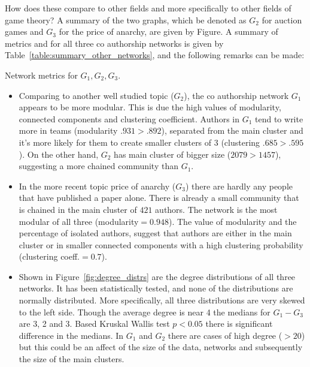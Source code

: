 \documentclass{article}
\theoremstyle{definition}
\begin{document}
How does these compare to other fields and more specifically to other fields of
game theory? A summary of the two graphs, which be denoted as \(G_2\) for auction
games and \(G_3\) for the price of anarchy, are given by Figure.
A summary of metrics and for all three co authorship networks is given by
Table~\ref{table:summary_other_networks}, and the following remarks can be made:

\begin{table}[!hbtp]
    \centering
    \resizebox{\textwidth}{!}{
    }
    \caption{Network metrics for \(G_1, G_2, G_3\).}\label{table:summary_other_networks}
\end{table}

\begin{itemize}
    \item Comparing to another well studied topic (\(G_2\)), the co authorship
    network \(G_1\) appears to be more modular. This is due the high values of
    modularity, connected components and clustering coefficient. Authors in \(G_1\)
    tend to write more in teams (modularity $.931 > .892$), separated from the
    main cluster and it's more likely for them to create smaller clusters of 3
    (clustering $.685 > .595$). On the other hand, \(G_2\) has main cluster
    of bigger size ($2079 > 1457$), suggesting a more chained community than \(G_1\).
    \item In the more recent topic price of anarchy (\(G_3\)) there are hardly
    any people that have published a paper alone. There is already a small community
    that is chained in the main cluster of $421$ authors. The network is the most modular
    of all three (modularity$=0.948$). The value of modularity and the percentage
    of isolated authors, suggest that authors are either in the main cluster or
    in smaller connected components with a high clustering probability (clustering
    coeff.$=0.7$).
    \item Shown in Figure~\ref{fig:degree_distrs} are the degree distributions of
    all three networks. It has been statistically tested, and none of the distributions
    are normally distributed. More specifically, all three distributions are
    very skewed to the left side. Though the average degree is near 4 the medians
    for \(G_1 - G_3\) are 3, 2 and 3. Based Kruskal Wallis test \(p< 0.05\) there
    is significant difference in the medians. In \(G_1\) and \(G_2\) there are cases
    of high degree (\(> 20\)) but this could be an affect of the size of the data,
    networks and subsequently the size of the main clusters.
\end{itemize}
\end{document}
